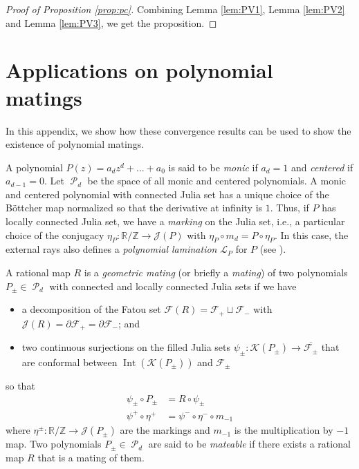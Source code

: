 \documentclass[11pt, reqno]{amsart}
\numberwithin{equation}{section}
\theoremstyle{plain}
\theoremstyle{theorem}
\theoremstyle{definition}
\newcommand{\R}{\mathbb{R}}
\newcommand{\Z}{\mathbb{Z}}
\DeclareMathOperator{\MP}{\mathcal{P}}
\DeclareMathOperator{\Int}{Int}
\numberwithin{figure}{section}
\begin{document}
\begin{proof}[Proof of Proposition \ref{prop:pc}]
Combining Lemma \ref{lem:PV1}, Lemma \ref{lem:PV2} and Lemma \ref{lem:PV3}, we get the proposition.
\end{proof}

\appendix
\section{Applications on polynomial matings}
In this appendix, we show how these convergence results can be used to show the existence of polynomial matings.

A polynomial $P(z) = a_dz^d+...+a_0$ is said to be {\em monic} if $a_d = 1$ and {\em centered} if $a_{d-1} = 0$.
Let $\MP_d$ be the space of all monic and centered polynomials.
A monic and centered polynomial with connected Julia set has a unique choice of the B\"ottcher map normalized so that the derivative at infinity is $1$.
Thus, if $P$ has locally connected Julia set, we have a {\em marking} on the Julia set, i.e., a particular choice of the conjugacy $\eta_P: \R/\Z \longrightarrow \mathcal{J}(P)$ with $\eta_P \circ m_d = P \circ \eta_P$.
In this case, the external rays also defines a {\em polynomial lamination} $\mathcal{L}_P$ for $P$ (see \cite{Thurston19}).

A rational map $R$ is a {\em geometric mating} (or briefly a {\em mating}) of two polynomials $P_\pm \in \MP_d$ with connected and locally connected Julia sets if we have
\begin{itemize}
\item a decomposition of the Fatou set $\mathcal{F}(R) = \mathcal{F}_+ \sqcup \mathcal{F}_-$ with $\mathcal{J}(R) = \partial \mathcal{F}_+ = \partial \mathcal{F}_-$; and
\item two continuous surjections on the filled Julia sets $\psi_\pm: \mathcal{K}(P_\pm) \rightarrow \overline{\mathcal{F}_\pm}$ that are conformal between $\Int(\mathcal{K}(P_\pm))$ and $\mathcal{F}_\pm$
\end{itemize}
so that
\begin{align*}
\psi_\pm \circ P_\pm &= R \circ \psi_\pm\\
\psi^+ \circ \eta^+ &= \psi^- \circ \eta^- \circ m_{-1}
\end{align*}
where $\eta^{\pm}: \R/\Z \rightarrow \mathcal{J}(P_\pm)$ are the markings and $m_{-1}$ is the multiplication by $-1$ map.
Two polynomials $P_\pm \in \MP_d$ are said to be {\em mateable} if there exists a rational map $R$ that is a mating of them.
\end{document}
